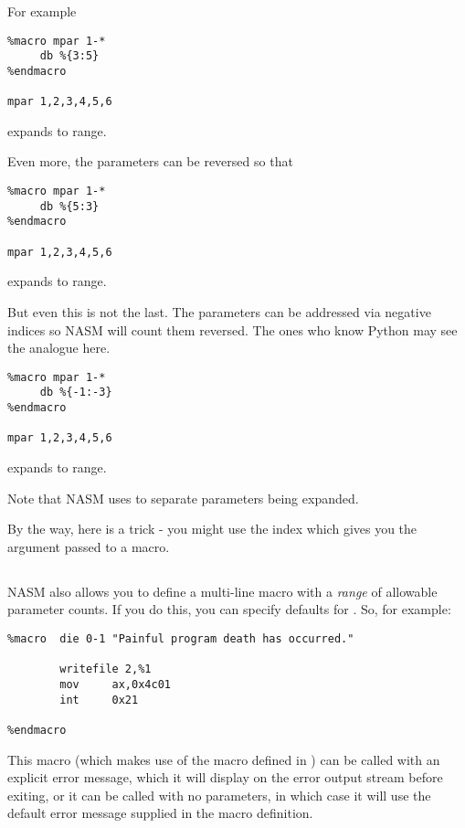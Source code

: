 For example

\begin{lstlisting}
%macro mpar 1-*
     db %{3:5}
%endmacro

mpar 1,2,3,4,5,6
\end{lstlisting}

expands to  range.

Even more, the parameters can be reversed so that

\begin{lstlisting}
%macro mpar 1-*
     db %{5:3}
%endmacro

mpar 1,2,3,4,5,6
\end{lstlisting}

expands to  range.

But even this is not the last. The parameters can be addressed via negative
indices so NASM will count them reversed. The ones who know Python may see
the analogue here.

\begin{lstlisting}
%macro mpar 1-*
     db %{-1:-3}
%endmacro

mpar 1,2,3,4,5,6
\end{lstlisting}

expands to  range.

Note that NASM uses  to separate parameters being expanded.

By the way, here is a trick - you might use the index 
which gives you the  argument passed to a macro.

\subsection{}
\label{subsec:mlmacdef}

NASM also allows you to define a multi-line macro with a \emph{range}
of allowable parameter counts. If you do this, you can specify
defaults for . So, for example:

\begin{lstlisting}
%macro  die 0-1 "Painful program death has occurred."

        writefile 2,%1
        mov     ax,0x4c01
        int     0x21

%endmacro
\end{lstlisting}

This macro (which makes use of the  macro defined in
) can be called with an explicit error message,
which it will display on the error output stream before exiting, or it can be
called with no parameters, in which case it will use the default
error message supplied in the macro definition.


